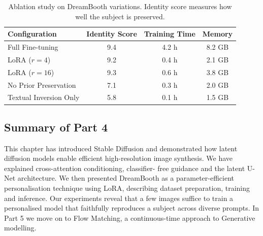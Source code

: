 \begin{table}[H]
  \centering
  \begin{tabular}{lccc}
    \toprule
    Configuration & Identity Score & Training Time & Memory \\
    \midrule
    Full Fine-tuning & 9.4 & 4.2 h & 8.2 GB \\
    LoRA ($r=4$) & 9.2 & 0.4 h & 2.1 GB \\
    LoRA ($r=16$) & 9.3 & 0.6 h & 3.8 GB \\
    No Prior Preservation & 7.1 & 0.3 h & 2.0 GB \\
    Textual Inversion Only & 5.8 & 0.1 h & 1.5 GB \\
    \bottomrule
  \end{tabular}
  \caption{Ablation study on DreamBooth variations.  Identity score
    measures how well the subject is preserved.}
  \label{tab:loraablation}
\end{table}

\subsection{Summary of Part 4}

This chapter has introduced Stable Diffusion and demonstrated how
latent diffusion models enable efficient high-resolution image
synthesis.  We have explained cross-attention conditioning, classifier-
free guidance and the latent U-Net architecture.  We then presented
DreamBooth as a parameter-efficient personalisation technique using
LoRA, describing dataset preparation, training and inference.  Our
experiments reveal that a few images suffice to train a personalised
model that faithfully reproduces a subject across diverse prompts.  In
Part 5 we move on to Flow Matching, a continuous-time approach to
Generative modelling.

